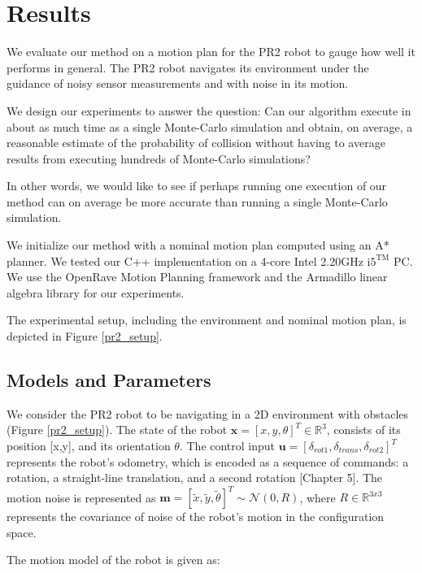 \documentclass[journal]{IEEEtran}
\begin{document}
\section{Results}
We evaluate our method on a motion plan for the PR2 robot to gauge how well it performs in general. The PR2 robot navigates its environment under the guidance of noisy sensor measurements and with noise in its motion.

We design our experiments to answer the question: Can our algorithm execute in about as much time as a single Monte-Carlo simulation and obtain, on average, a reasonable estimate of the probability of collision without having to average results from executing hundreds of Monte-Carlo simulations?

In other words, we would like to see if perhaps running one execution of our method can on average be more accurate than running a single Monte-Carlo simulation.

We initialize our method with a nominal motion plan computed using an A* planner. We tested our C++ implementation on a 4-core Intel 2.20GHz $\text{i5}^{\text{TM}}$ PC. We use the OpenRave Motion Planning framework and the Armadillo linear algebra library \cite{IEEEhowto:sanderson} for our experiments.

The experimental setup, including the environment and nominal motion plan, is depicted in Figure \ref{pr2_setup}.

\subsection{Models and Parameters}
We consider the PR2 robot to be navigating in a 2D environment with obstacles (Figure \ref{pr2_setup}). The state of the robot $\textbf{x} = [x,y,\theta]^T \in \mathbb{R}^3$, consists of its position [x,y], and its orientation $\theta$. The control input $\textbf{u} = [\delta_{rot1},\delta_{trans},\delta_{rot2}]^T$ represents the robot's odometry, which is encoded as a sequence of commands: a rotation, a straight-line translation, and a second rotation \cite{IEEEhowto:thrun} [Chapter 5]. The motion noise is represented as $\textbf{m} = [\tilde{x},\tilde{y},\tilde{\theta}]^T \sim \mathcal{N}(0,R)$, where $R \in \mathbb{R}^{3x3}$ represents the covariance of noise of the robot's motion in the configuration space. 

The motion model of the robot is given as:
\end{document}
